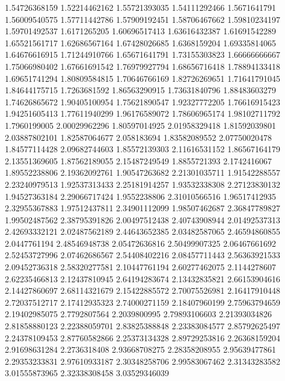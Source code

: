  1.54726368159    1.52214462162
  1.55721393035    1.54111292466
   1.5671641791    1.56009540575
  1.57711442786    1.57909192451
  1.58706467662    1.59810234197
  1.59701492537     1.6171265205
  1.60696517413    1.63616432387
  1.61691542289    1.65521561717
  1.62686567164    1.67428026685
   1.6368159204    1.69335814065
  1.64676616915    1.71244910766
  1.65671641791    1.73155303823
  1.66666666667    1.75066980402
  1.67661691542    1.76979927794
  1.68656716418    1.78894133418
  1.69651741294    1.80809584815
  1.70646766169    1.82726269651
  1.71641791045    1.84644175715
   1.7263681592    1.86563290915
  1.73631840796    1.88483603279
  1.74626865672    1.90405100954
  1.75621890547    1.92327772205
  1.76616915423    1.94251605413
  1.77611940299    1.96176589072
  1.78606965174    1.98102711792
   1.7960199005    2.00029962296
  1.80597014925    2.01958329418
  1.81592039801    2.03887802101
  1.82587064677      2.058183694
  1.83582089552    2.07750020478
  1.84577114428    2.09682744603
  1.85572139303    2.11616531152
  1.86567164179    2.13551369605
  1.87562189055    2.15487249549
   1.8855721393     2.1742416067
  1.89552238806    2.19362092761
  1.90547263682    2.21301035711
  1.91542288557    2.23240979513
  1.92537313433    2.25181914257
  1.93532338308    2.27123830132
  1.94527363184    2.29066717424
   1.9552238806    2.31010566516
  1.96517412935    2.32955367883
  1.97512437811    2.34901112099
  1.98507462687    2.36847789827
  1.99502487562    2.38795391826
  2.00497512438    2.40743908944
  2.01492537313    2.42693332121
  2.02487562189    2.44643652385
  2.03482587065    2.46594860855
   2.0447761194    2.48546948738
  2.05472636816    2.50499907325
  2.06467661692    2.52453727996
  2.07462686567    2.54408402216
  2.08457711443    2.56363921533
  2.09452736318    2.58320277581
  2.10447761194    2.60277462075
   2.1144278607    2.62235466813
  2.12437810945    2.64194283674
  2.13432835821    2.66153904616
  2.14427860697    2.68114321679
  2.15422885572    2.70075526981
  2.16417910448    2.72037512717
  2.17412935323    2.74000271159
  2.18407960199    2.75963794659
  2.19402985075     2.7792807564
   2.2039800995    2.79893106603
  2.21393034826    2.81858880123
  2.22388059701    2.83825388848
  2.23383084577    2.85792625497
  2.24378109453    2.87760582866
  2.25373134328    2.89729253816
  2.26368159204    2.91698631284
   2.2736318408    2.93668708275
  2.28358208955    2.95639477861
  2.29353233831    2.97610933187
  2.30348258706    2.99583067462
  2.31343283582    3.01555873965
  2.32338308458    3.03529346039
